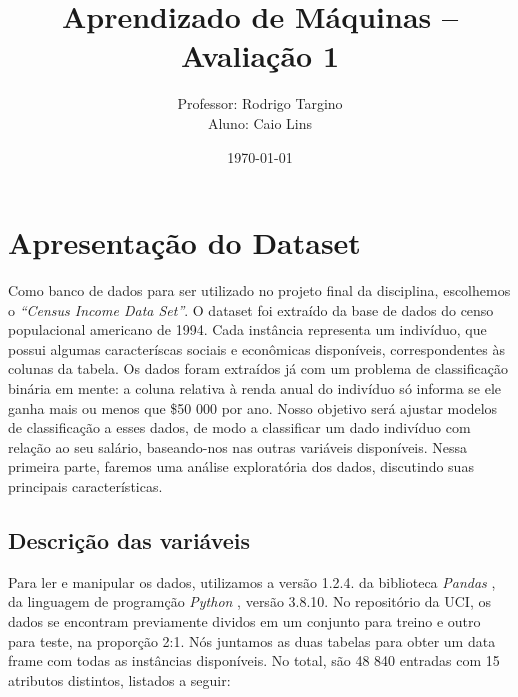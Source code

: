 \documentclass[a4paper, 12pt]{article}
\title{Aprendizado de Máquinas -- Avaliação 1}
\author{Professor: Rodrigo Targino \\
        Aluno: Caio Lins}
\date{\today}
\begin{document}
\maketitle

\section{Apresentação do Dataset}

Como banco de dados para ser utilizado no projeto final da disciplina, escolhemos o \emph{``Census Income Data Set''}\cite{uci}.
O dataset foi extraído da base de dados do censo populacional americano de 1994.
Cada instância representa um indivíduo, que possui algumas caracteríscas sociais e econômicas disponíveis, correspondentes às colunas da tabela.
Os dados foram extraídos já com um problema de classificação binária em mente: a coluna relativa à renda anual do indivíduo só informa se ele ganha mais ou menos que \$50 000 por ano.
Nosso objetivo será ajustar modelos de classificação a esses dados, de modo a classificar um dado indivíduo com relação ao seu salário, baseando-nos nas outras variáveis disponíveis.
Nessa primeira parte, faremos uma análise exploratória dos dados, discutindo suas principais características.

\subsection{Descrição das variáveis}

Para ler e manipular os dados, utilizamos a versão 1.2.4. da biblioteca \emph{Pandas} \cite{pandas}, da linguagem de programção \emph{Python} \cite{python}, versão 3.8.10.
No repositório da UCI, os dados se encontram previamente dividos em um conjunto para treino e outro para teste, na proporção 2:1.
Nós juntamos as duas tabelas para obter um data frame com todas as instâncias disponíveis.
No total, são 48 840 entradas com 15 atributos distintos, listados a seguir:
\end{document}
